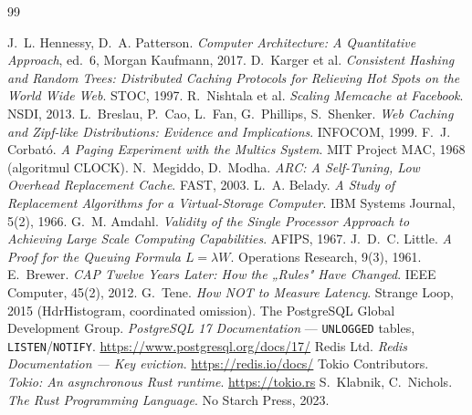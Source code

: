 \documentclass[11pt,a4paper,oneside]{report}
\begin{document}
\tableofcontents










\begin{thebibliography}{99}
 J.~L. Hennessy, D.~A. Patterson. \emph{Computer Architecture: A Quantitative Approach}, ed.~6, Morgan Kaufmann, 2017.
 D.~Karger et al. \emph{Consistent Hashing and Random Trees: Distributed Caching Protocols for Relieving Hot Spots on the World Wide Web}. STOC, 1997.
 R.~Nishtala et al. \emph{Scaling Memcache at Facebook}. NSDI, 2013.
 L.~Breslau, P.~Cao, L.~Fan, G.~Phillips, S.~Shenker. \emph{Web Caching and Zipf-like Distributions: Evidence and Implications}. INFOCOM, 1999.
 F.~J. Corbató. \emph{A Paging Experiment with the Multics System}. MIT Project MAC, 1968 (algoritmul CLOCK).
 N.~Megiddo, D.~Modha. \emph{ARC: A Self-Tuning, Low Overhead Replacement Cache}. FAST, 2003.
 L.~A. Belady. \emph{A Study of Replacement Algorithms for a Virtual-Storage Computer}. IBM Systems Journal, 5(2), 1966.
 G.~M. Amdahl. \emph{Validity of the Single Processor Approach to Achieving Large Scale Computing Capabilities}. AFIPS, 1967.
 J.~D.~C. Little. \emph{A Proof for the Queuing Formula $L = \lambda W$}. Operations Research, 9(3), 1961.
 E.~Brewer. \emph{CAP Twelve Years Later: How the „Rules" Have Changed}. IEEE Computer, 45(2), 2012.
 G.~Tene. \emph{How NOT to Measure Latency}. Strange Loop, 2015 (HdrHistogram, coordinated omission).
 The PostgreSQL Global Development Group. \emph{PostgreSQL 17 Documentation} — \texttt{UNLOGGED} tables, \texttt{LISTEN}/\texttt{NOTIFY}. \url{https://www.postgresql.org/docs/17/}
 Redis Ltd. \emph{Redis Documentation — Key eviction}. \url{https://redis.io/docs/}
 Tokio Contributors. \emph{Tokio: An asynchronous Rust runtime}. \url{https://tokio.rs}
 S.~Klabnik, C.~Nichols. \emph{The Rust Programming Language}. No Starch Press, 2023.
\end{thebibliography}

\appendix

\end{document}
